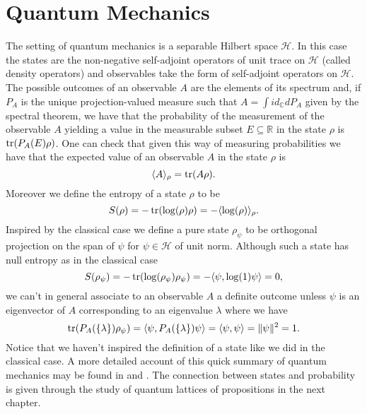 \section{Quantum Mechanics}\label{sec:QM}

The setting of quantum mechanics is a separable Hilbert space $\mathcal{H}$. In this case the states are the non-negative self-adjoint operators of unit trace on $\mathcal{H}$ (called density operators) and observables take the form of self-adjoint operators on $\mathcal{H}$. The possible outcomes of an observable $A$ are the elements of its spectrum and, if $P_A$ is the unique projection-valued measure such that $A=\int id_\mathbb{C}dP_A$ given by the spectral theorem, we have that the probability of the measurement of the observable $A$ yielding a value in the measurable subset $E\subseteq\mathbb{R}$ in the state $\rho$ is $\operatorname{tr}(P_A(E)\rho)$. One can check that given this way of measuring probabilities we have that the expected value of an observable $A$ in the state $\rho$ is
\begin{equation}\label{eq:quantum_states}
\langle A\rangle_\rho = \operatorname{tr}(A\rho).
\end{equation}
Moreover we define the entropy of a state $\rho$ to be
\begin{equation}\label{eq:Q_entropy}
S(\rho)=-\operatorname{tr}(\log(\rho)\rho)=-\langle \log(\rho)\rangle_\rho.
\end{equation}
Inspired by the classical case we define a pure state $\rho_\psi$ to be orthogonal projection on the span of $\psi$ for $\psi\in\mathcal{H}$ of unit norm. Although such a state has null entropy as in the classical case
\begin{equation}\label{eqn:entropy_pure}
S(\rho_\psi)=-\operatorname{tr}(\log(\rho_\psi)\rho_\psi)=-\langle\psi,\log(1)\psi\rangle = 0,
\end{equation} 
we can't in general associate to an observable $A$ a definite outcome unless $\psi$ is an eigenvector of $A$ corresponding to an eigenvalue $\lambda$ where we have 
\begin{equation}
\operatorname{tr}(P_A(\{\lambda\})\rho_\psi)=\langle\psi,P_A(\{\lambda\})\psi\rangle=\langle\psi,\psi\rangle=\|\psi\|^2=1. 
\end{equation}
Notice that we haven't inspired the definition of a state like we did in the classical case. A more detailed account of this quick summary of quantum mechanics may be found in \cite{Strocchi2008a} and \cite{Hall2013}. The connection between states and probability is given through the study of quantum lattices of propositions in the next chapter.